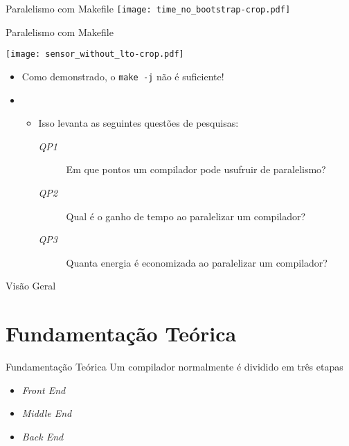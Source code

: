 \begin{frame}
    Paralelismo com Makefile
    \texttt{[image: time\_no\_bootstrap-crop.pdf]}
    \label{fig:analysis_classical}
\end{frame}

\begin{frame}
    Paralelismo com Makefile

    \centering
    \texttt{[image: sensor\_without\_lto-crop.pdf]}
    \label{fig:analysis_classical}
\end{frame}

\begin{frame}
    \begin{itemize}
        \item Como demonstrado, o \texttt{make -j} não é suficiente!
        \item[]
        \begin{itemize}
            \item Isso levanta as seguintes questões de pesquisas:
            \begin{description}
                \item[\textit{QP1}] Em que pontos um compilador pode usufruir de paralelismo?
                \item[\textit{QP2}] Qual é o ganho de tempo ao paralelizar um compilador?
                \item[\textit{QP3}] Quanta energia é economizada ao paralelizar um compilador?
            \end{description}
        \end{itemize}
    \end{itemize}
\end{frame}



\begin{frame}{Visão Geral}
  \overview
\end{frame}

\section{Fundamentação Teórica}

\begin{frame}{Fundamentação Teórica}
  Um compilador normalmente é dividido em três etapas
  \begin{itemize}
    \item \textit{Front End}
    \item \textit{Middle End}
    \item \textit{Back End}
  \end{itemize}
\end{frame}


